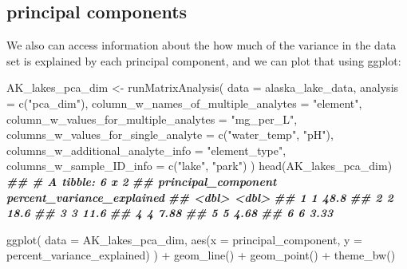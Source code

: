\documentclass[
]{krantz}
\newenvironment{Shaded}{\begin{snugshade}}{\end{snugshade}}
\newcommand{\AttributeTok}[1]{\textcolor[rgb]{0.77,0.63,0.00}{#1}}
\newcommand{\DocumentationTok}[1]{\textcolor[rgb]{0.56,0.35,0.01}{\textbf{\textit{#1}}}}
\newcommand{\FunctionTok}[1]{\textcolor[rgb]{0.00,0.00,0.00}{#1}}
\newcommand{\NormalTok}[1]{#1}
\newcommand{\OtherTok}[1]{\textcolor[rgb]{0.56,0.35,0.01}{#1}}
\newcommand{\SpecialCharTok}[1]{\textcolor[rgb]{0.00,0.00,0.00}{#1}}
\newcommand{\StringTok}[1]{\textcolor[rgb]{0.31,0.60,0.02}{#1}}
\begin{document}
\hypertarget{principal-components}{%
\subsection{principal components}\label{principal-components}}

We also can access information about the how much of the variance in the data set is explained by each principal component, and we can plot that using ggplot:

\begin{Shaded}
\begin{Highlighting}[]
\NormalTok{AK\_lakes\_pca\_dim }\OtherTok{\textless{}{-}} \FunctionTok{runMatrixAnalysis}\NormalTok{(}
  \AttributeTok{data =}\NormalTok{ alaska\_lake\_data,}
  \AttributeTok{analysis =} \FunctionTok{c}\NormalTok{(}\StringTok{"pca\_dim"}\NormalTok{),}
  \AttributeTok{column\_w\_names\_of\_multiple\_analytes =} \StringTok{"element"}\NormalTok{,}
  \AttributeTok{column\_w\_values\_for\_multiple\_analytes =} \StringTok{"mg\_per\_L"}\NormalTok{,}
  \AttributeTok{columns\_w\_values\_for\_single\_analyte =} \FunctionTok{c}\NormalTok{(}\StringTok{"water\_temp"}\NormalTok{, }\StringTok{"pH"}\NormalTok{),}
  \AttributeTok{columns\_w\_additional\_analyte\_info =} \StringTok{"element\_type"}\NormalTok{,}
  \AttributeTok{columns\_w\_sample\_ID\_info =} \FunctionTok{c}\NormalTok{(}\StringTok{"lake"}\NormalTok{, }\StringTok{"park"}\NormalTok{)}
\NormalTok{)}
\FunctionTok{head}\NormalTok{(AK\_lakes\_pca\_dim)}
\DocumentationTok{\#\# \# A tibble: 6 x 2}
\DocumentationTok{\#\#   principal\_component percent\_variance\_explained}
\DocumentationTok{\#\#                 \textless{}dbl\textgreater{}                      \textless{}dbl\textgreater{}}
\DocumentationTok{\#\# 1                   1                      48.8 }
\DocumentationTok{\#\# 2                   2                      18.6 }
\DocumentationTok{\#\# 3                   3                      11.6 }
\DocumentationTok{\#\# 4                   4                       7.88}
\DocumentationTok{\#\# 5                   5                       4.68}
\DocumentationTok{\#\# 6                   6                       3.33}

\FunctionTok{ggplot}\NormalTok{(}
  \AttributeTok{data =}\NormalTok{ AK\_lakes\_pca\_dim, }
  \FunctionTok{aes}\NormalTok{(}\AttributeTok{x =}\NormalTok{ principal\_component, }\AttributeTok{y =}\NormalTok{ percent\_variance\_explained)}
\NormalTok{) }\SpecialCharTok{+}
  \FunctionTok{geom\_line}\NormalTok{() }\SpecialCharTok{+}
  \FunctionTok{geom\_point}\NormalTok{() }\SpecialCharTok{+}
  \FunctionTok{theme\_bw}\NormalTok{()}
\end{Highlighting}
\end{Shaded}
\end{document}
